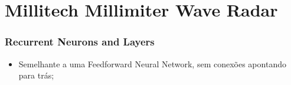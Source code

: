 \documentclass[xcolor=dvipsnames, aspectratio=169]{beamer}
\begin{document}
\section[Millitech Millimiter Wave Radar]{Millitech Millimiter Wave Radar} 

\begin{frame}
\frametitle{Recurrent Neurons and Layers}
	\begin{itemize}
		\item Semelhante a uma Feedforward Neural Network, sem conexões apontando para trás;
	\end{itemize}
\end{frame}



\begin{frame}
    \printbibliography
\end{frame}


\begin{frame}
\titlepage %
\end{frame}
\end{document}
